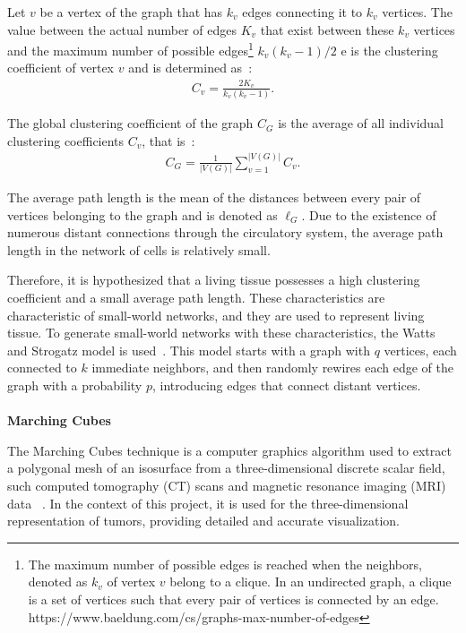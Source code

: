 \documentclass[a4paper,11pt]{article}
\begin{document}
{Let $v$ be a vertex of the graph that has $k_v$ edges connecting it to $k_v$ vertices. The value between the actual number of edges $K_v$ that exist between these $k_v$ vertices and the maximum number of possible edges\footnote{The maximum number of possible edges is reached when the neighbors, denoted as $k_v$ of vertex $v$ belong to a clique. In an undirected graph, a clique is a set of vertices such that every pair of vertices is connected by an edge. https://www.baeldung.com/cs/graphs-max-number-of-edges} $k_v(k_v-1)/2$ e is the clustering coefficient of vertex $v$ and is determined as~\cite{7}:
\begin{align}
C_v = \displaystyle\frac{2K_v}{k_v(k_v-1)}. \label{eq-clustering}
\end{align}

The global clustering coefficient of the graph $C_G$ is the average of all individual clustering coefficients $C_v$, that is~\cite{7}:
\begin{align}
C_G = \displaystyle\frac{1}{|V(G)|}\sum _{v=1} ^{|V(G)|} C_v. \label{eq-global-clustering}
\end{align}

The average path length is the mean of the distances between every pair of vertices belonging to the graph and is denoted as $\ell_G$. Due to the existence of numerous distant connections through the circulatory system, the average path length in the network of cells is relatively small.

Therefore, it is hypothesized that a living tissue possesses a high clustering coefficient and a small average path length. These characteristics are characteristic of small-world networks, and they are used to represent living tissue. To generate small-world networks with these characteristics, the Watts and Strogatz model is used~\cite{9}. This model starts with a graph with $q$ vertices, each connected to $k$ immediate neighbors, and then randomly rewires each edge of the graph with a probability $p$, introducing edges that connect distant vertices.\\
\\
\textbf{Marching Cubes}

The Marching Cubes technique is a computer graphics algorithm used to extract a polygonal mesh of an isosurface from a three-dimensional discrete scalar field, such computed tomography (CT) scans and magnetic resonance imaging (MRI) data ~\cite{5}. In the context of this project, it is used for the three-dimensional representation of tumors, providing detailed and accurate visualization.

}
\end{document}
